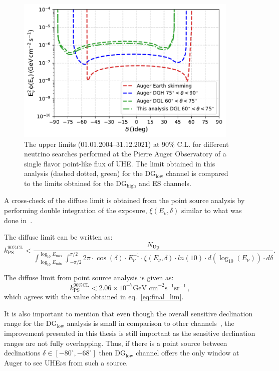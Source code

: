 \begin{figure}[ht]
  \centering
  
  \includegraphics[width=0.95\textwidth]{thesis_figures/PointLimits/Point_comp_combined_3.pdf}
  \caption{The upper limits  (01.01.2004–31.12.2021) at 90\% C.L. for different neutrino searches performed at the Pierre Auger Observatory of a single flavor point-like flux of UHE. The limit obtained in this analysis (dashed dotted, green) for the DG$_{\text{low}}$ channel is compared to the limits obtained for the DG$_{\text{high}}$ and ES channels.}
  \label{fig:Dec_limit_comb3}
\end{figure}

A cross-check of the diffuse limit is obtained from the point source analysis by performing double integration of the exposure, $\xi(E_{\nu}, \delta)$ similar to what was done in~\cite{gap_note_2013}.

The diffuse limit can be written as:
\begin{equation}
  k_{\text{PS}}^{90\% \text{CL}} < \frac{N_{\text{Up}}}{\int_{\log_{10}E_{\text{min}}}^{\log_{10}E_{\text{max}}} \int_{-\pi/2}^{\pi/2}2\pi \cdot \cos(\delta) \cdot E_{\nu}^{-1} \cdot \xi(E_{\nu}, \delta) \cdot ln(10) \cdot d(\log_{10}(E_{\nu})) \cdot d\delta} .
\end{equation}

The diffuse limit from point source analysis is given as: 
\begin{equation}
  k_{\text{PS}}^{90\%\text{CL}} < 2.06 \times 10^{-7} \text{GeV cm}^{-2} \text{s}^{-1} \text{sr}^{-1}\, ,
\end{equation}
which agrees with the value obtained in eq.~\ref{eq:final_lim}.

It is also important to mention that even though the overall sensitive declination range for the DG$_{\text{low}}$ analysis is small in comparison to other channels~\cite{Aab_2019_point}, the improvement presented in this thesis is still important as the sensitive declination ranges are not fully overlapping. Thus, if there is a point source between declinations $ \delta \in [-80^{\circ}, -68^{\circ}]$ then DG$_{\text{low}}$ channel offers the only window at Auger to see UHE$\nu$s from such a source.  

